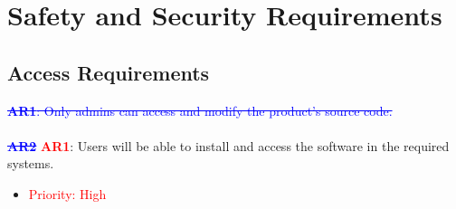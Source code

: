 \documentclass{article}
\begin{document}
\newpage
\section{Safety and Security Requirements}
\subsection{Access Requirements}

\textcolor{blue}{\sout{\textbf{AR1}: Only admins can access and modify the product's source code.}}\\\\
\textcolor{blue}{\sout{\textbf{AR2}}} \textcolor{red}{\textbf{AR1}}: Users will be able to install and access the software in the required systems.
\begin{itemize}
    \item \textcolor{red}{Priority: High}
\end{itemize}
\end{document}
